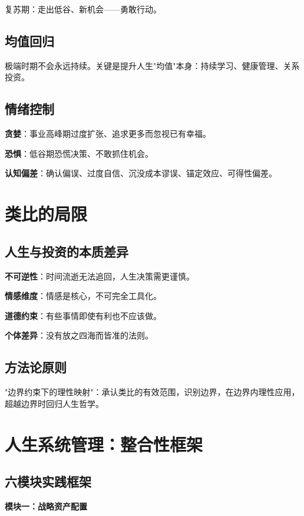 \documentclass[12pt,a4paper]{article}
\begin{document}
复苏期：走出低谷、新机会——勇敢行动。

\subsection{均值回归}

极端时期不会永远持续。关键是提升人生"均值"本身：持续学习、健康管理、关系投资。

\subsection{情绪控制}

\textbf{贪婪}：事业高峰期过度扩张、追求更多而忽视已有幸福。

\textbf{恐惧}：低谷期恐慌决策、不敢抓住机会。

\textbf{认知偏差}：确认偏误、过度自信、沉没成本谬误、锚定效应、可得性偏差。

\section{类比的局限}

\subsection{人生与投资的本质差异}

\textbf{不可逆性}：时间流逝无法追回，人生决策需更谨慎。

\textbf{情感维度}：情感是核心，不可完全工具化。

\textbf{道德约束}：有些事情即使有利也不应该做。

\textbf{个体差异}：没有放之四海而皆准的法则。

\subsection{方法论原则}

"边界约束下的理性映射"：承认类比的有效范围，识别边界，在边界内理性应用，超越边界时回归人生哲学。

\section{人生系统管理：整合性框架}

\subsection{六模块实践框架}

\textbf{模块一：战略资产配置}
\end{document}
